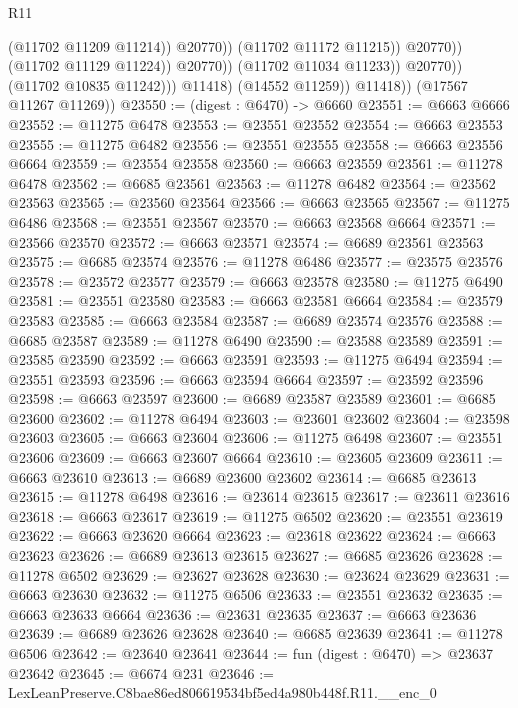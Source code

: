 \begin{lexlean}{R11}
\begin{coremodule}
                                          (@11702 @11209 @11214))
                                        @20770))
                                    (@11702 @11172 @11215))
                                  @20770))
                              (@11702 @11129 @11224))
                            @20770))
                        (@11702 @11034 @11233))
                      @20770))
                  (@11702 @10835 @11242)))
              @11418)
            (@14552 @11259))
          @11418))
      (@17567 @11267 @11269))
@23550 := (digest : @6470) -> @6660
@23551 := @6663 @6666
@23552 := @11275 @6478
@23553 := @23551 @23552
@23554 := @6663 @23553
@23555 := @11275 @6482
@23556 := @23551 @23555
@23558 := @6663 @23556 @6664
@23559 := @23554 @23558
@23560 := @6663 @23559
@23561 := @11278 @6478
@23562 := @6685 @23561
@23563 := @11278 @6482
@23564 := @23562 @23563
@23565 := @23560 @23564
@23566 := @6663 @23565
@23567 := @11275 @6486
@23568 := @23551 @23567
@23570 := @6663 @23568 @6664
@23571 := @23566 @23570
@23572 := @6663 @23571
@23574 := @6689 @23561 @23563
@23575 := @6685 @23574
@23576 := @11278 @6486
@23577 := @23575 @23576
@23578 := @23572 @23577
@23579 := @6663 @23578
@23580 := @11275 @6490
@23581 := @23551 @23580
@23583 := @6663 @23581 @6664
@23584 := @23579 @23583
@23585 := @6663 @23584
@23587 := @6689 @23574 @23576
@23588 := @6685 @23587
@23589 := @11278 @6490
@23590 := @23588 @23589
@23591 := @23585 @23590
@23592 := @6663 @23591
@23593 := @11275 @6494
@23594 := @23551 @23593
@23596 := @6663 @23594 @6664
@23597 := @23592 @23596
@23598 := @6663 @23597
@23600 := @6689 @23587 @23589
@23601 := @6685 @23600
@23602 := @11278 @6494
@23603 := @23601 @23602
@23604 := @23598 @23603
@23605 := @6663 @23604
@23606 := @11275 @6498
@23607 := @23551 @23606
@23609 := @6663 @23607 @6664
@23610 := @23605 @23609
@23611 := @6663 @23610
@23613 := @6689 @23600 @23602
@23614 := @6685 @23613
@23615 := @11278 @6498
@23616 := @23614 @23615
@23617 := @23611 @23616
@23618 := @6663 @23617
@23619 := @11275 @6502
@23620 := @23551 @23619
@23622 := @6663 @23620 @6664
@23623 := @23618 @23622
@23624 := @6663 @23623
@23626 := @6689 @23613 @23615
@23627 := @6685 @23626
@23628 := @11278 @6502
@23629 := @23627 @23628
@23630 := @23624 @23629
@23631 := @6663 @23630
@23632 := @11275 @6506
@23633 := @23551 @23632
@23635 := @6663 @23633 @6664
@23636 := @23631 @23635
@23637 := @6663 @23636
@23639 := @6689 @23626 @23628
@23640 := @6685 @23639
@23641 := @11278 @6506
@23642 := @23640 @23641
@23644 := fun (digest : @6470) => @23637 @23642
@23645 := @6674 @231
@23646 := LexLeanPreserve.C8bae86ed806619534bf5ed4a980b448f.R11.__enc_0

\end{coremodule}
\end{lexlean}
